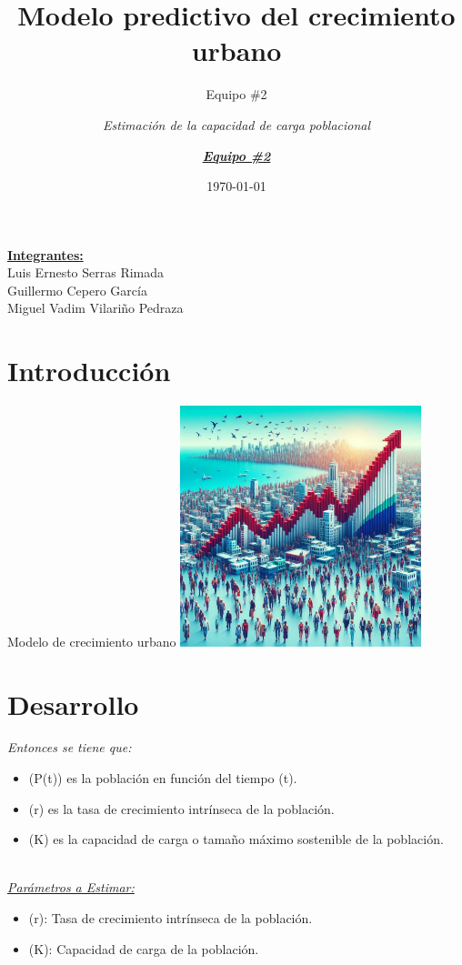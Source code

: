 \documentclass{beamer}
\title{Modelo predictivo del crecimiento urbano}
\subtitle{Equipo \#2}
\author{\textit{Estimación de la capacidad de carga poblacional}}
\date{\today}
\begin{document}

\begin{frame}
    \titlepage 
    \underline{\textbf{Integrantes: }}\\
    Luis Ernesto Serras Rimada \\ Guillermo Cepero García \\ Miguel Vadim Vilariño Pedraza
\end{frame}

\logo{}
\author{\textit{\underline{\textbf{Equipo \#2}}}}

\section{Introducción}
\begin{frame}{Modelo de crecimiento urbano}
    \includegraphics[height = 7cm]{img/cuba1.jpeg}
\end{frame} 

\section{Desarrollo}
\begin{frame}

\textit{Entonces se tiene que:}
\begin{itemize}
    \item (P(t)) es la población en función del tiempo (t).
    \item (r) es la tasa de crecimiento intrínseca de la población.
    \item (K) es la capacidad de carga o tamaño máximo sostenible de la población.
\end{itemize}\\

\textit{\underline{Parámetros a Estimar:}}
\begin{itemize}
    \item (r): Tasa de crecimiento intrínseca de la población. 
    \item (K): Capacidad de carga de la población.
\end{itemize}
\end{frame}
\end{document}
